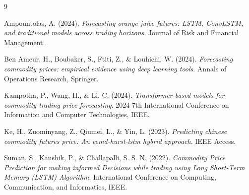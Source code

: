 \documentclass[a4paper,oneside]{scrbook}
\begin{document}
\begin{thebibliography}{9}

Ampountolas, A. (2024). 
\textit{Forecasting orange juice futures: LSTM, ConvLSTM, and traditional models across trading horizons}. 
Journal of Risk and Financial Management.

Ben Ameur, H., Boubaker, S., Ftiti, Z., \& Louhichi, W. (2024). 
\textit{Forecasting commodity prices: empirical evidence using deep learning tools}. 
Annals of Operations Research, Springer.

Kampotha, P., Wang, H., \& Li, C. (2024). 
\textit{Transformer-based models for commodity trading price forecasting}. 
2024 7th International Conference on Information and Computer Technologies, IEEE.

Ke, H., Zuominyang, Z., Qiumei, L., \& Yin, L. (2023). 
\textit{Predicting chinese commodity futures price: An eemd-hurst-lstm hybrid approach}. 
IEEE Access.

Suman, S., Kaushik, P., \& Challapalli, S. S. N. (2022). 
\textit{Commodity Price Prediction for making informed Decisions while trading using Long Short-Term Memory (LSTM) Algorithm}. 
International Conference on Computing, Communication, and Informatics, IEEE.

\end{thebibliography}
\end{document}
